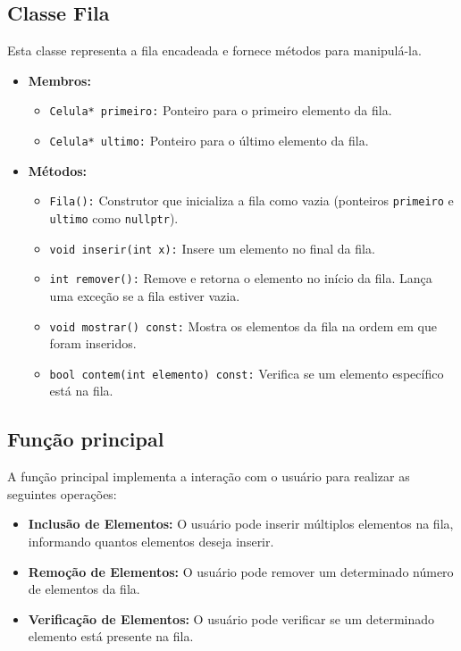 \documentclass[a4paper,12pt]{article}
\begin{document}
\subsection{Classe Fila}
Esta classe representa a fila encadeada e fornece métodos para manipulá-la.
\begin{itemize}
    \item \textbf{Membros:}
    \begin{itemize}
        \item \texttt{Celula* primeiro:} Ponteiro para o primeiro elemento da fila.
        \item \texttt{Celula* ultimo:} Ponteiro para o último elemento da fila.
    \end{itemize}
    \item \textbf{Métodos:}
    \begin{itemize}
        \item \texttt{Fila():} Construtor que inicializa a fila como vazia (ponteiros \texttt{primeiro} e \texttt{ultimo} como \texttt{nullptr}).
        \item \texttt{void inserir(int x):} Insere um elemento no final da fila.
        \item \texttt{int remover():} Remove e retorna o elemento no início da fila. Lança uma exceção se a fila estiver vazia.
        \item \texttt{void mostrar() const:} Mostra os elementos da fila na ordem em que foram inseridos.
        \item \texttt{bool contem(int elemento) const:} Verifica se um elemento específico está na fila.
    \end{itemize}
\end{itemize}

\subsection{Função principal}
A função principal implementa a interação com o usuário para realizar as seguintes operações:
\begin{itemize}
    \item \textbf{Inclusão de Elementos:} O usuário pode inserir múltiplos elementos na fila, informando quantos elementos deseja inserir.
    \item \textbf{Remoção de Elementos:} O usuário pode remover um determinado número de elementos da fila.
    \item \textbf{Verificação de Elementos:} O usuário pode verificar se um determinado elemento está presente na fila.
\end{itemize}
\end{document}
